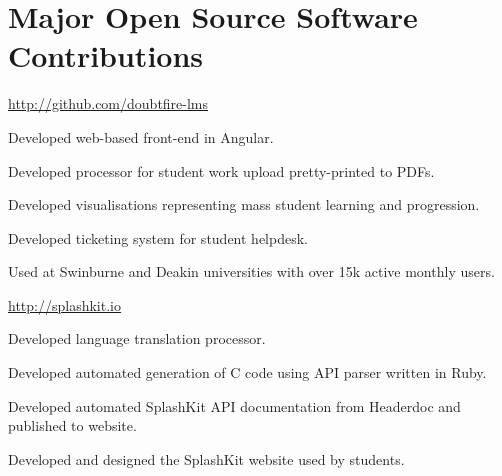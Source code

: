 \section{Major Open Source Software Contributions}

\begin{multicols}{2}

{}
{
}
{\href{http://github.com/doubtfire-lms}{http://github.com/doubtfire-lms}}
{
  \item Developed web-based front-end in Angular.
  \item Developed processor for student work upload pretty-printed to PDFs.
  \item Developed visualisations representing mass student learning and progression.
  \item Developed ticketing system for student helpdesk.
  \item Used at Swinburne and Deakin universities with over 15k active monthly users.
}

\columnbreak

{}
{
}
{\href{http://splashkit.io}{http://splashkit.io}}
{
  \item Developed language translation processor.
  \item Developed automated generation of C code using API parser written in Ruby.
  \item Developed automated SplashKit API documentation from Headerdoc and published to website.
  \item Developed and designed the SplashKit website used by students.
}
\hfill

\end{multicols}